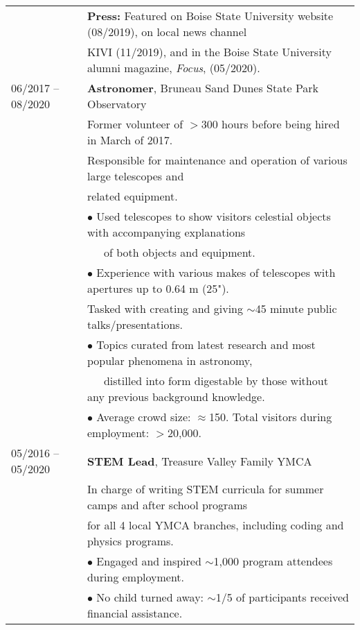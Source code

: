 \documentclass[11pt]{article}
\begin{document}
\begin{tabular}{ll}
      & \textbf{Press:} Featured on Boise State University website (08/2019), on local news channel\\
      & KIVI (11/2019), and in the Boise State University alumni magazine, \textit{Focus}, (05/2020). \vspace{2mm} \\
06/2017 -- 08/2020   &   \textbf{Astronomer}, Bruneau Sand Dunes State Park Observatory \\
      & Former volunteer of $>$300 hours before being hired in March of 2017.\vspace{1mm} \\
      & Responsible for maintenance and operation of various large telescopes and \\
      & related equipment.\\
      & $\bullet$ Used telescopes to show visitors celestial objects with accompanying explanations\\
      & \-\ \-\ \-\ of both objects and equipment.\\
      & $\bullet$ Experience with various makes of telescopes with apertures up to 0.64 m (25").\vspace{1mm} \\
      & Tasked with creating and giving $\sim$45 minute public talks/presentations.\\
      & $\bullet$ Topics curated from latest research and most popular phenomena in astronomy, \\
      & \-\ \-\ \-\ distilled into form digestable by those without any previous background knowledge.\\
      & $\bullet$ Average crowd size: $\approx$150. Total visitors during employment: $>$20,000.\vspace{2mm}\\
05/2016 -- 05/2020   &   \textbf{STEM Lead}, Treasure Valley Family YMCA \vspace{1mm} \\
      & In charge of writing STEM curricula for summer camps and after school programs \\
      & for all 4 local YMCA branches, including coding and physics programs. \vspace{0.5mm}\\
      & $\bullet$ Engaged and inspired $\sim$1,000 program attendees during employment. \\
      & $\bullet$ No child turned away: $\sim$1/5 of participants received financial assistance. \\

\end{tabular}
\end{document}
